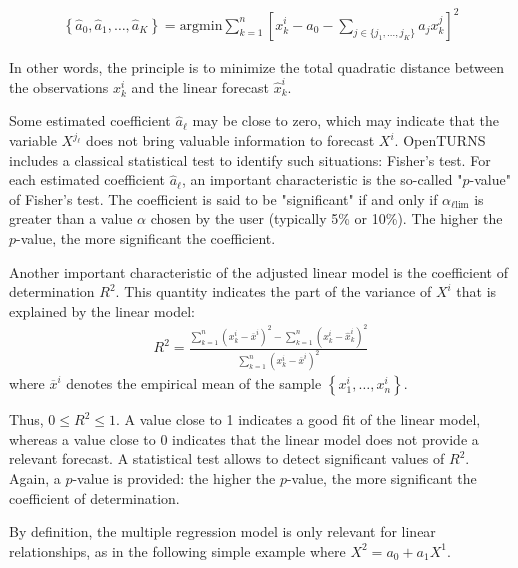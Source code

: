 {  \begin{align*}
    \left\{ \widehat{a}_0,\widehat{a}_1,\ldots,\widehat{a}_{K} \right\} = \textrm{argmin} \sum_{k=1}^n \left[ x^i_k - a_0 - \sum_{j \in \{ j_1,\ldots,j_K \} } a_j x^j_k \right]^2
  \end{align*}

  In other words, the principle is to minimize the total quadratic distance between the observations $x^i_k$ and the linear forecast $\widehat{x}^i_k$.

  Some estimated coefficient $\widehat{a}_\ell$ may be close to zero, which may indicate that the variable $X^{j_\ell}$ does not bring valuable information to forecast $X^i$. OpenTURNS includes a classical statistical test to identify such situations: Fisher's test.  For each estimated coefficient $\widehat{a}_\ell$, an important characteristic is the so-called "$p$-value" of Fisher's test. The coefficient is said to be "significant" if and only if $\alpha_{\ell \textrm{lim}}$ is greater than a value $\alpha$ chosen by the user (typically 5\% or 10\%). The higher the $p$-value, the more significant the coefficient.

  Another important characteristic of the adjusted linear model is the coefficient of determination $R^2$. This quantity indicates the part of the variance of $X^i$ that is explained by the linear model:
  \begin{align*}
    R^2 = \frac{ \displaystyle \sum_{k=1}^n \left( x^i_k - \overline{x}^i \right)^2 - \sum_{k=1}^n \left( x^i_k - \widehat{x}_k^i \right)^2 }{ \sum_{k=1}^n \left( x^i_k - \overline{x}^i \right)^2 }
  \end{align*}
  where $\overline{x}^i$ denotes the empirical mean of the sample $\left\{ x^i_1,\ldots,x^i_n  \right\}$.

  Thus, $0 \leq R^2 \leq 1$. A value close to 1 indicates a good fit of the linear model, whereas a value close to 0 indicates that the linear model does not provide a relevant forecast. A statistical test allows to detect significant values of $R^2$. Again, a $p$-value is provided: the higher the $p$-value, the more significant the coefficient of determination.

  By definition, the multiple regression model is only relevant for linear relationships, as in the following simple example where $X^2 = a_0 + a_1 X^1$.

}
